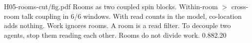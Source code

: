 {H05-rooms-cut/fig.pdf}
{Rooms as two coupled spin blocks.}
{Within-room $>$ cross-room talk coupling in 6/6 windows. With read counts in the model, co-location adds nothing. Work ignores rooms.}
{A room is a read filter. To decouple two agents, stop them reading each other. Rooms do not divide work.}
{0.88}{2.20}
